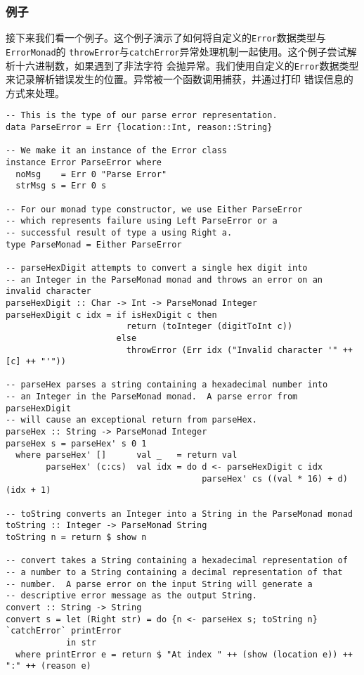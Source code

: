 \subsubsection{例子}
\indent{}接下来我们看一个例子。这个例子演示了如何将自定义的\texttt{Error}数据类型与\texttt{ErrorMonad}的
\texttt{throwError}与\texttt{catchError}异常处理机制一起使用。这个例子尝试解析十六进制数，如果遇到了非法字符
会抛异常。我们使用自定义的\texttt{Error}数据类型来记录解析错误发生的位置。异常被一个函数调用捕获，并通过打印
错误信息的方式来处理。
\vspace{-0.8em}
\begin{verbatim}
-- This is the type of our parse error representation.
data ParseError = Err {location::Int, reason::String}

-- We make it an instance of the Error class
instance Error ParseError where
  noMsg    = Err 0 "Parse Error"
  strMsg s = Err 0 s

-- For our monad type constructor, we use Either ParseError
-- which represents failure using Left ParseError or a
-- successful result of type a using Right a.
type ParseMonad = Either ParseError

-- parseHexDigit attempts to convert a single hex digit into
-- an Integer in the ParseMonad monad and throws an error on an invalid character
parseHexDigit :: Char -> Int -> ParseMonad Integer
parseHexDigit c idx = if isHexDigit c then
                        return (toInteger (digitToInt c))
                      else
                        throwError (Err idx ("Invalid character '" ++ [c] ++ "'"))

-- parseHex parses a string containing a hexadecimal number into
-- an Integer in the ParseMonad monad.  A parse error from parseHexDigit
-- will cause an exceptional return from parseHex.
parseHex :: String -> ParseMonad Integer
parseHex s = parseHex' s 0 1
  where parseHex' []      val _   = return val
        parseHex' (c:cs)  val idx = do d <- parseHexDigit c idx
                                       parseHex' cs ((val * 16) + d) (idx + 1)

-- toString converts an Integer into a String in the ParseMonad monad
toString :: Integer -> ParseMonad String
toString n = return $ show n

-- convert takes a String containing a hexadecimal representation of
-- a number to a String containing a decimal representation of that
-- number.  A parse error on the input String will generate a
-- descriptive error message as the output String.
convert :: String -> String
convert s = let (Right str) = do {n <- parseHex s; toString n} `catchError` printError
            in str
  where printError e = return $ "At index " ++ (show (location e)) ++ ":" ++ (reason e)
\end{verbatim}
\clearpage

